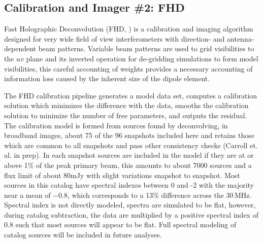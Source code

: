 \documentclass[twolcolumn,iop]{emulateapj}
\begin{document}
\subsection{Calibration and Imager \#2: FHD}
\label{sec:FHD}
Fast Holographic Deconvolution (FHD, \cite{Sullivan:2012p9457}) is a calibration and imaging algorithm designed for very wide field of view interferometers with direction- and antenna-dependent beam patterns. Variable beam patterns are used to grid visibilities to the $uv$ plane and its inverted operation for de-gridding simulations to form model visibilities, this careful accounting of weights provides a necessary accounting of information loss caused by the inherent size of the dipole element.

The FHD calibration pipeline generates a model data set, computes a calibration solution which minimizes the difference with the data, smooths the calibration solution to minimize the number of free parameters, and outputs the residual. The calibration model is formed from sources found by deconvolving, in broadband images, about 75 of the 96 snapshots included here and retains those which are common to all snapshots and pass other consistency checks (Carroll et. al. in prep). In each snapshot sources are included in the model if they are at or above 1\% of the peak primary beam, this amounts to about 7000 sources and a flux limit of about 80mJy with slight variations snapshot to snapshot. Most sources in this catalog have spectral indexes between 0 and -2 with the majority near a mean of $-0.8$, which corresponds to a 13\% difference across the 30\,MHz.  Spectral index is not directly modeled, spectra are simulated to be flat, however, during catalog subtraction, the data are multiplied by a positive spectral index of 0.8 such that most sources will appear to be flat. Full spectral modeling of catalog sources will be included in future analyses.
\end{document}
